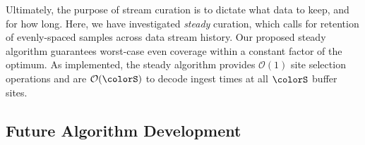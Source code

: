 Ultimately, the purpose of stream curation is to dictate what data to keep, and for how long.
Here, we have investigated \textit{steady} curation, which calls for retention of evenly-spaced samples across data stream history.
Our proposed steady algorithm guarantees worst-case even coverage within a constant factor of the optimum.
As implemented, the steady algorithm provides $\mathcal{O}(1)$ site selection operations and are $\mathcal{O}(\colorS)$ to decode ingest times at all $\colorS$ buffer sites.

\subsection{Future Algorithm Development}


